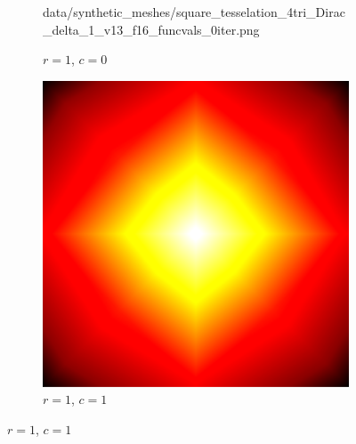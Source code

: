 \begin{figure}[ht]
\begin{subfigure}[b]{0.32\linewidth}
		{data/synthetic_meshes/square_tesselation_4tri_Dirac_delta_1_v13_f16_funcvals_0iter.png}
		\caption{$r=1$, $c=0$}\label{fig:sq2.b}
	\end{subfigure}
	\begin{subfigure}[b]{0.32\linewidth}
		\includegraphics[width=\linewidth]
		{data/synthetic_meshes/square_tesselation_4tri_Dirac_delta_1_v13_f16_funcvals_1iter.png}
		\caption{$r=1$, $c=1$}\label{fig:sq2.c}
	\end{subfigure}


\end{figure}
